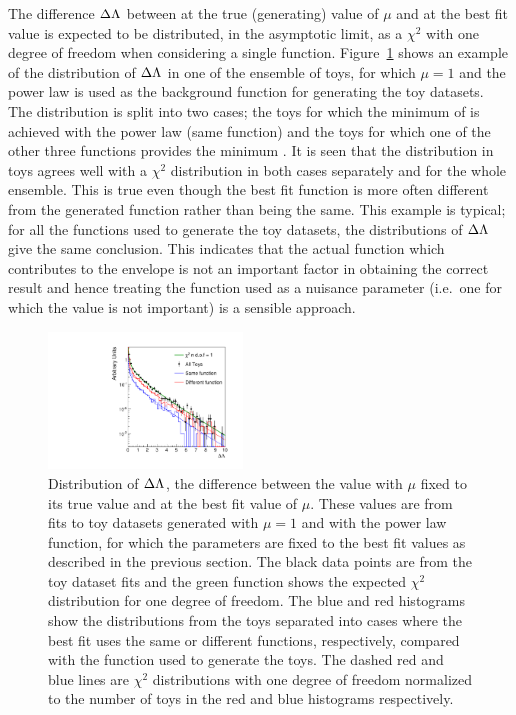 The difference $\Delta\Lambda$  between \nll at the true (generating) value of $\mu$ and at the best fit value is expected to be distributed, in the 
asymptotic limit, as a $\chi^{2}$ with one degree of freedom when considering a single function.
Figure~\ref{fig:functions:chisq} shows an example of the distribution of $\Delta\Lambda$ in one of the ensemble of toys, for which $\mu=1$ and
the power law is used as the background function
for generating the toy datasets.
The distribution is split into two cases; the toys for which the minimum of \nll is achieved with the 
power law (same function) and the toys for which one of the other three functions provides the minimum \nll.
It is seen that the distribution in toys agrees well with a $\chi^2$ distribution in both cases separately and for the whole ensemble. 
This is true even though the best fit function is more often different from the generated function rather than being the same.
This example is typical; for all the functions used to generate the toy datasets, the distributions of $\Delta\Lambda$ give the same conclusion.
This indicates that the actual function which contributes to the envelope is not an important factor in obtaining the correct result
and hence treating the function used as a nuisance parameter (i.e.~one for which the value is not important) is a sensible approach. 
%
\begin{figure}[tbp]
\centering
\includegraphics[width=0.46\textwidth]{functions/gen_pow1_mu1_bias_hists_2parfamily_Correcion_0.pdf}
\caption{Distribution of  $\Delta\Lambda$, the difference
between the \nll value with $\mu$ fixed to its true value and \nll at the best fit value
of $\mu$. These values are from fits to toy datasets generated with 
$\mu=1$ and with the power law function, for which the parameters are fixed to the best fit values as described in the previous section.
The black data points are from the toy dataset fits and the green function
shows the expected $\chi^2$ distribution for one degree of freedom. The blue and red histograms show the distributions from the toys 
separated into cases where the best fit uses the same or different functions, respectively, compared with the function used to generate the toys. 
The dashed red and blue lines are $\chi^{2}$ distributions with one degree of freedom normalized to the number of toys in the red and blue histograms respectively.}
\label{fig:functions:chisq}
\end{figure}

